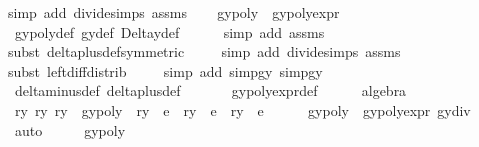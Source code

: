 \begin{isabellebody}
{\isacharparenleft}simp\ add{\isacharcolon}\ divide{\isacharunderscore}simps\ assms{\isacharparenleft}{}{\isacharminus}{}{\isacharparenright}{\isacharparenright}\isanewline
\isanewline
\ \ \isamarkupfalse%
\ {\isachardoublequoteopen}gypoly\ {\isacharequal}\ gypoly{\isacharunderscore}expr{\isachardoublequoteclose}\isanewline
\ \ \ \ \isamarkupfalse%
\ gypoly{\isacharunderscore}def\ g\isactrlsub y{\isacharunderscore}def\ Delta\isactrlsub y{\isacharunderscore}def\ \isanewline
\ \ \ \ \isamarkupfalse%
{\isacharparenleft}simp\ add{\isacharcolon}\ assms{\isacharparenleft}{}{\isacharcomma}{}{\isacharparenright}{\isacharparenright}\isanewline
\ \ \ \ \isamarkupfalse%
{\isacharparenleft}subst\ delta{\isacharunderscore}plus{\isacharunderscore}def{\isacharbrackleft}symmetric{\isacharbrackright}{\isacharparenright}{\isacharplus}\isanewline
\ \ \ \ \isamarkupfalse%
{\isacharparenleft}simp\ add{\isacharcolon}\ divide{\isacharunderscore}simps\ assms{\isacharparenleft}{}{}{\isacharcomma}{}{}{\isacharparenright}{\isacharparenright}\isanewline
\ \ \ \ \isamarkupfalse%
{\isacharparenleft}subst\ left{\isacharunderscore}diff{\isacharunderscore}distrib{\isacharparenright}\isanewline
\ \ \ \ \isamarkupfalse%
{\isacharparenleft}simp\ add{\isacharcolon}\ simp{}gy\ simp{}gy{\isacharparenright}\isanewline
\ \ \ \ \isamarkupfalse%
\ delta{\isacharunderscore}minus{\isacharunderscore}def\ delta{\isacharunderscore}plus{\isacharunderscore}def\ \isanewline
\ \ \ \ \isamarkupfalse%
\ gypoly{\isacharunderscore}expr{\isacharunderscore}def\isanewline
\ \ \ \ \isamarkupfalse%
\ algebra\isanewline
\isanewline
\ \ \isamarkupfalse%
\ r{}y\ r{}y\ r{}y\ \ {\isachardoublequoteopen}gypoly\ {\isacharequal}\ r{}y\ {\isacharasterisk}\ e{}\ {\isacharplus}\ r{}y\ {\isacharasterisk}\ e{}\ {\isacharplus}\ r{}y\ {\isacharasterisk}\ e{}{\isachardoublequoteclose}\isanewline
\ \ \ \ \isamarkupfalse%
\ {\isacartoucheopen}gypoly\ {\isacharequal}\ gypoly{\isacharunderscore}expr{\isacartoucheclose}\ gy{\isacharunderscore}div\ \isamarkupfalse%
\ auto\isanewline
\ \ \isamarkupfalse%
\ \isamarkupfalse%
\ {\isachardoublequoteopen}gypoly\ {\isacharequal}\ {}{\isachardoublequoteclose}\ \isanewline

\end{isabellebody}
